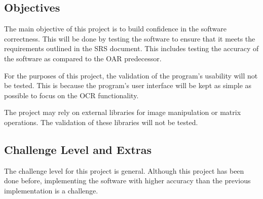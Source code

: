 \documentclass[12pt, titlepage]{article}
\begin{document}
\subsection{Objectives}

The main objective of this project is to build confidence in the software
correctness. This will be done by testing the software to ensure that it meets
the requirements outlined in the SRS document. This includes testing the accuracy
of the software as compared to the OAR predecessor.

For the purposes of this project, the validation of the program's usability
will not be tested. This is because the program's user interface will be kept
as simple as possible to focus on the OCR functionality.

The project may rely on external libraries for image manipulation or matrix
operations. The validation of these libraries will not be tested.




\subsection{Challenge Level and Extras}

The challenge level for this project is general. Although this project has been
done before, implementing the software with higher accuracy than the previous
implementation is a challenge.
\end{document}
